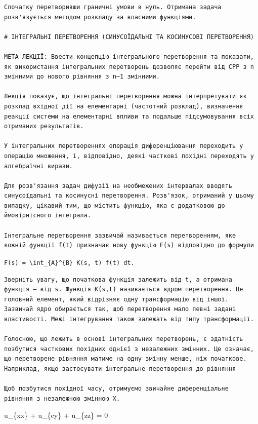 \documentclass[
  ukrainian,
]{article}
\begin{document}
\begin{verbatim}
Спочатку перетворивши граничні умови в нуль. Отримана задача розв'язується методом розкладу за власними функціями.

# ІНТЕГРАЛЬНІ ПЕРЕТВОРЕННЯ (СИНУСОЇДАЛЬНІ ТА КОСИНУСОВІ ПЕРЕТВОРЕННЯ)

МЕТА ЛЕКЦІЇ: Ввести концепцію інтегрального перетворення та показати, як використання інтегральних перетворень дозволяє перейти від CPP з n змінними до нового рівняння з n—1 змінними.

Лекція показує, що інтегральні перетворення можна інтерпретувати як розклад вхідної дії на елементарні (частотний розклад), визначення реакції системи на елементарні впливи та подальше підсумовування всіх отриманих результатів.

У інтегральних перетвореннях операція диференціювання переходить у операцію множення, і, відповідно, деякі часткові похідні переходять у алгебраїчні вирази.

Для розв'язання задач дифузії на необмежених інтервалах вводять синусоїдальні та косинусні перетворення. Розв'язок, отриманий у цьому випадку, цікавий тим, що містить функцію, яка є додатковою до ймовірнісного інтеграла.

Інтегральне перетворення зазвичай називається перетворенням, яке кожній функції f(t) призначає нову функцію F(s) відповідно до формули
\end{verbatim}

\texttt{F(s)\ =\ \textbackslash{}int\_\{A\}\^{}\{B\}\ K(s,\ t)\ f(t)\ dt.}

\begin{verbatim}
Зверніть увагу, що початкова функція залежить від t, а отримана функція — від s. Функція K(s,t) називається ядром перетворення. Це головний елемент, який відрізняє одну трансформацію від іншої. Зазвичай ядро обирається так, щоб перетворення мало певні задані властивості. Межі інтегрування також залежать від типу трансформації.

Голосною, що лежить в основі інтегральних перетворень, є здатність позбутися часткових похідних однієї з незалежних змінних. Це означає, що перетворене рівняння матиме на одну змінну менше, ніж початкове. Наприклад, якщо застосувати інтегральне перетворення до рівняння

Щоб позбутися похідної часу, отримуємо звичайне диференціальне рівняння з незалежною змінною X.
\end{verbatim}

u\_\{xx\} + u\_\{cy\} + u\_\{zz\} = 0
\end{document}
